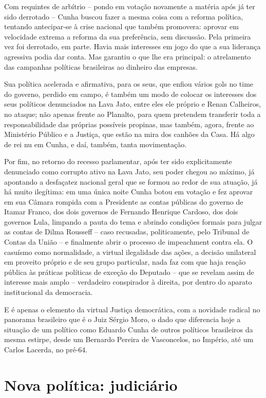 Com requintes de arbítrio -- pondo em votação novamente a matéria após
já ter sido derrotado -- Cunha buscou fazer a mesma coisa com a reforma
política, tentando antecipar-se à crise nacional que também promovera:
aprovar em velocidade extrema a reforma da sua preferência, sem
discussão. Pela primeira vez foi derrotado, em parte. Havia mais
interesses em jogo do que a sua liderança agressiva podia dar conta. Mas
garantiu o que lhe era principal: o atrelamento das campanhas políticas
brasileiras ao dinheiro das empresas.

Sua política acelerada e afirmativa, para os seus, que enfiou vários
gols no time do governo, perdido em campo, é também um modo de colocar os
interesses dos seus políticos denunciados na Lava Jato, entre eles ele
próprio e Renan Calheiros, no ataque; não apenas frente ao Planalto,
para quem pretendem transferir toda a responsabilidade das próprias
possíveis propinas, mas também, agora, frente ao Ministério Público e a
Justiça, que estão na mira dos canhões da Casa. Há algo de rei nu em
Cunha, e daí, também, tanta movimentação.

Por fim, no retorno do recesso parlamentar, após ter sido explicitamente
denunciado como corrupto ativo na Lava Jato, seu poder chegou ao máximo, já
apontando a desfaçatez nacional geral que se formou ao redor de sua atuação, já
há muito ilegítima: em uma única noite Cunha botou em votação e fez aprovar em
sua Câmara rompida com a Presidente as contas públicas do governo de Itamar
Franco, dos dois governos de Fernando Henrique Cardoso, dos dois governos Lula,
limpando a pauta do tema e abrindo condições formais para julgar as contas de
Dilma Rousseff – caso recusadas, politicamente, pelo Tribunal de Contas da União
–  e finalmente abrir o processo de impeachment contra ela. O casuísmo como
normalidade, a virtual ilegalidade das ações, a decisão unilateral em proveito
próprio e de seu grupo particular, nada faz com que haja reação pública às
práticas políticas de exceção do Deputado -- que se revelam assim de interesse
mais amplo -- verdadeiro conspirador à direita, por dentro do aparato
institucional da democracia.

E é apenas o elemento da virtual Justiça democrática, com a novidade
radical no panorama brasileiro que é o Juiz Sérgio Moro, o dado que
diferencia hoje a situação de um político como Eduardo Cunha de outros
políticos brasileiros da mesma estirpe, desde um Bernardo Pereira de
Vasconcelos, no Império, até um Carlos Lacerda, no pré-64.

  \section{Nova política:
  judiciário}\label{nova-poluxedtica-judiciuxe1rio}

